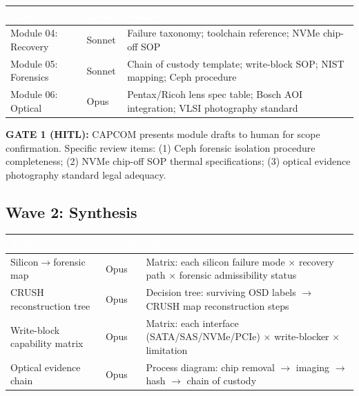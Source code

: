 \documentclass[11pt,letterpaper]{article}
\newcommand{\tableheader}[1]{\textbf{\sffamily\textcolor{white}{#1}}}
\begin{document}
\begin{center}
\begin{tabularx}{\textwidth}{L{3cm}C{1.5cm}X}
\toprule
{}
\tableheader{Task} & \tableheader{Model} & \tableheader{Output} \\
\midrule
Module 04: Recovery & Sonnet & Failure taxonomy; toolchain reference; NVMe chip-off SOP \\
Module 05: Forensics & Sonnet & Chain of custody template; write-block SOP; NIST mapping; Ceph procedure \\
Module 06: Optical & Opus & Pentax/Ricoh lens spec table; Bosch AOI integration; VLSI photography standard \\
\bottomrule
\end{tabularx}
\end{center}

\textbf{GATE 1 (HITL):} CAPCOM presents module drafts to human for scope confirmation. Specific review items: (1) Ceph forensic isolation procedure completeness; (2) NVMe chip-off SOP thermal specifications; (3) optical evidence photography standard legal adequacy.

\subsection{Wave 2: Synthesis}

\begin{center}
\begin{tabularx}{\textwidth}{L{3.5cm}C{1.5cm}X}
\toprule
{}
\tableheader{Task} & \tableheader{Model} & \tableheader{Output} \\
\midrule
Silicon$\rightarrow$forensic map & Opus & Matrix: each silicon failure mode $\times$ recovery path $\times$ forensic admissibility status \\
CRUSH reconstruction tree & Opus & Decision tree: surviving OSD labels $\rightarrow$ CRUSH map reconstruction steps \\
Write-block capability matrix & Opus & Matrix: each interface (SATA/SAS/NVMe/PCIe) $\times$ write-blocker $\times$ limitation \\
Optical evidence chain & Opus & Process diagram: chip removal $\rightarrow$ imaging $\rightarrow$ hash $\rightarrow$ chain of custody \\
\bottomrule
\end{tabularx}
\end{center}
\end{document}
